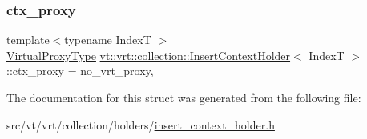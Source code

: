 \subsubsection{\texorpdfstring{ctx\+\_\+proxy}{ctx\_proxy}}
{\footnotesize\ttfamily template$<$typename IndexT $>$ \\
\hyperlink{namespacevt_a1b417dd5d684f045bb58a0ede70045ac}{Virtual\+Proxy\+Type} \hyperlink{structvt_1_1vrt_1_1collection_1_1_insert_context_holder}{vt\+::vrt\+::collection\+::\+Insert\+Context\+Holder}$<$ IndexT $>$\+::ctx\+\_\+proxy = no\+\_\+vrt\+\_\+proxy\hspace{0.3cm}{\ttfamily [static]}, {\ttfamily [private]}}



The documentation for this struct was generated from the following file\+:\begin{DoxyCompactItemize}
\item 
src/vt/vrt/collection/holders/\hyperlink{insert__context__holder_8h}{insert\+\_\+context\+\_\+holder.\+h}\end{DoxyCompactItemize}
